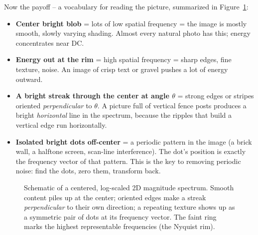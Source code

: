 Now the payoff -- a vocabulary for reading the picture, summarized in
Figure~\ref{ch31:fig-spectrum}:

\begin{itemize}
\item \textbf{Center bright blob} = lots of low spatial frequency = the image is
mostly smooth, slowly varying shading. Almost every natural photo has this; energy
concentrates near DC.
\item \textbf{Energy out at the rim} = high spatial frequency = sharp edges, fine
texture, noise. An image of crisp text or gravel pushes a lot of energy outward.
\item \textbf{A bright streak through the center at angle $\theta$} = strong edges
or stripes oriented \emph{perpendicular} to $\theta$. A picture full of vertical
fence posts produces a bright \emph{horizontal} line in the spectrum, because the
ripples that build a vertical edge run horizontally.
\item \textbf{Isolated bright dots off-center} = a periodic pattern in the image
(a brick wall, a halftone screen, scan-line interference). The dot's position is
exactly the frequency vector of that pattern. This is the key to removing periodic
noise: find the dots, zero them, transform back.
\end{itemize}

\begin{figure}[H]
\centering
{}
\caption{Schematic of a centered, log-scaled 2D magnitude spectrum. Smooth
content piles up at the center; oriented edges make a streak \emph{perpendicular}
to their own direction; a repeating texture shows up as a symmetric pair of dots
at its frequency vector. The faint ring marks the highest representable
frequencies (the Nyquist rim).}
\label{ch31:fig-spectrum}
\end{figure}

